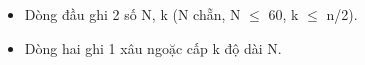 \begin{itemize}
	\item Dòng đầu ghi 2 số N, k (N chẵn, N  $\le$  60, k  $\le$  n/2).
	\item Dòng hai ghi 1 xâu ngoặc cấp k độ dài N.
\end{itemize}

\